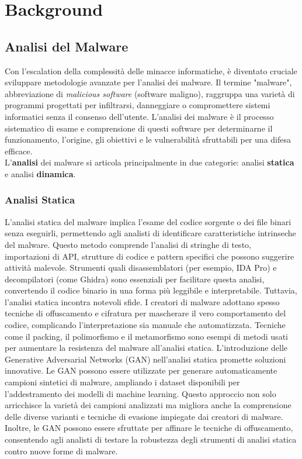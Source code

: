 \chapter{Background}
\label{cap:background}

\section{Analisi del Malware}
Con l'escalation della complessità delle minacce informatiche, è diventato cruciale sviluppare metodologie avanzate per l'analisi dei malware. Il termine "malware", abbreviazione di \emph{malicious software} (software maligno), raggruppa una varietà di programmi progettati per infiltrarsi, danneggiare o compromettere sistemi informatici senza il consenso dell'utente. L'analisi dei malware è il processo sistematico di esame e comprensione di questi software per determinarne il funzionamento, l'origine, gli obiettivi e le vulnerabilità sfruttabili per una difesa efficace. \\ 
L'\textbf{analisi} dei malware si articola principalmente in due categorie: analisi \textbf{statica} e analisi \textbf{dinamica}.

\subsection{Analisi Statica}
L'analisi statica del malware implica l'esame del codice sorgente o dei file binari senza eseguirli, permettendo agli analisti di identificare caratteristiche intrinseche del malware. Questo metodo comprende l'analisi di stringhe di testo, importazioni di API, strutture di codice e pattern specifici che possono suggerire attività malevole. Strumenti quali disassemblatori (per esempio, IDA Pro) e decompilatori (come Ghidra) sono essenziali per facilitare questa analisi, convertendo il codice binario in una forma più leggibile e interpretabile.
Tuttavia, l'analisi statica incontra notevoli sfide. I creatori di malware adottano spesso tecniche di offuscamento e cifratura per mascherare il vero comportamento del codice, complicando l'interpretazione sia manuale che automatizzata. Tecniche come il packing, il polimorfismo e il metamorfismo sono esempi di metodi usati per aumentare la resistenza del malware all'analisi statica.
L'introduzione delle Generative Adversarial Networks (GAN) nell'analisi statica promette soluzioni innovative. Le GAN possono essere utilizzate per generare automaticamente campioni sintetici di malware, ampliando i dataset disponibili per l'addestramento dei modelli di machine learning. Questo approccio non solo arricchisce la varietà dei campioni analizzati ma migliora anche la comprensione delle diverse varianti e tecniche di evasione impiegate dai creatori di malware. Inoltre, le GAN possono essere sfruttate per affinare le tecniche di offuscamento, consentendo agli analisti di testare la robustezza degli strumenti di analisi statica contro nuove forme di malware.



